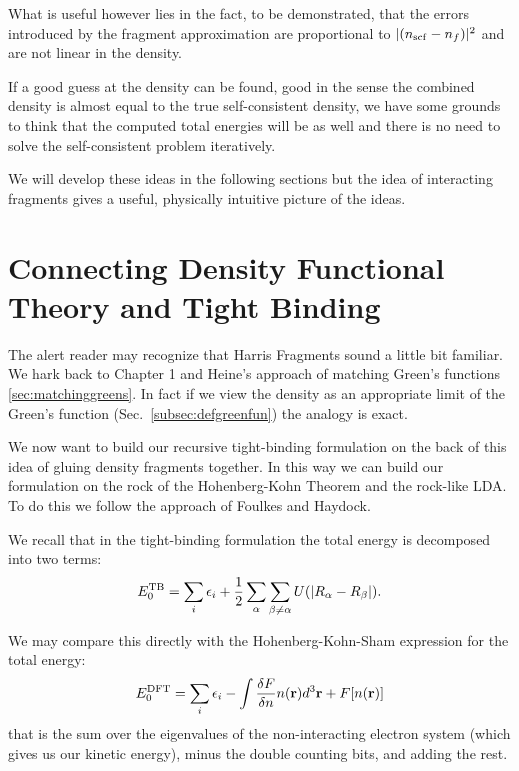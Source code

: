 What is useful however lies in the
fact, to be demonstrated, that the errors introduced by the fragment approximation 
are proportional to $|(n_{\rm scf}-n_{f})|^2$ and are not linear in the density. 

If a good guess at the density can be found, good in the sense the combined 
density is almost equal to the true self-consistent density, we have some 
grounds to think that the computed total energies will be as well
and there is no need to solve the self-consistent problem iteratively.

We will develop these ideas in the following sections but the idea of 
interacting fragments gives a useful, physically intuitive picture of
the ideas.

\section{Connecting Density Functional Theory and Tight Binding}
The alert reader may recognize that Harris Fragments sound a little bit 
familiar. We hark back to Chapter 1 and Heine's approach of matching Green's functions \ref{sec:matchinggreens}. 
In fact if we view the density as an appropriate limit of the Green's function (Sec.~\ref{subsec:defgreenfun})
the analogy is exact.

We now want to build our recursive tight-binding formulation on the back of this idea of 
gluing density fragments together. In this way we can build our formulation on the rock of the 
Hohenberg-Kohn Theorem and the rock-like LDA. To do this we follow the approach of Foulkes and Haydock\cite{foulkes89}.

We recall that in the tight-binding formulation the total energy is decomposed into two terms:
%
\begin{equation}
\label{eq:totentb}
E_{0}^{\rm TB} = \sum_{i}\epsilon_{i} + \frac{1}{2}\sum_{\alpha} \sum_{\beta \ne \alpha}U(|R_{\alpha} -R_{\beta}|).
\end{equation}
%

We may compare this directly with the Hohenberg-Kohn-Sham expression for the total energy:
%
\begin{equation}
\label{eq:totendft}
E_{0}^{\rm DFT} = \sum_{i}\epsilon_{i} - \int \frac{\delta F}{\delta n}n({\bf r})d^{3}{\bf r} + F[n({\bf r})] 
\end{equation}
%
that is the sum over the eigenvalues of the non-interacting electron system (which gives us our kinetic
energy), minus the double counting bits, and adding the rest.

